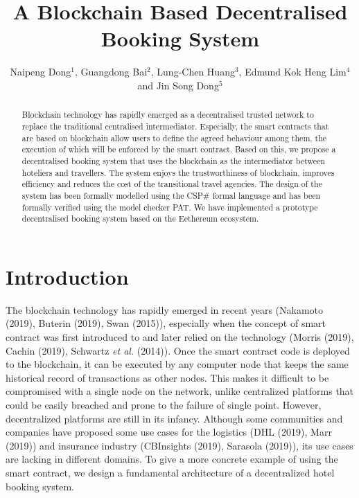 \documentclass{KERauth}
\begin{document}


\onehalfspacing

\title{A Blockchain Based Decentralised Booking System}

\author{Naipeng Dong$^1$, Guangdong Bai$^2$, Lung-Chen Huang$^3$, Edmund Kok Heng Lim$^4$ and Jin Song Dong$^{5}$}
\address{$^{1,3,4,5}$School of Computing, National University of Singapore, COM$1$, $13$ Computing Drive, $117417$, Singapore\\ ~$^{2,5}$School of Information and Communication Technology, Griffith University, N$44$ $2.28$, $170$ Kessels Road Nathan, QLD, $4111$, Australia\\
, $^2$g.bai@griffith.edu.au, $^3$lungchenhuang@u.nus.edu, $^4$e0335737@u.nus.edu, $^5$dcsdjs@nus.edu.sg}


\begin{abstract}
Blockchain technology has rapidly emerged as a decentralised trusted network to replace the traditional centralised intermediator. Especially, the smart contracts that are based on blockchain allow users to define the agreed behaviour among them, the execution of which will be enforced by the smart contract. Based on this, we propose a decentralised booking system that uses the blockchain as the intermediator between hoteliers and travellers. The system enjoys the trustworthiness of blockchain, improves efficiency and reduces the cost of the transitional travel agencies. The design of the system has been formally modelled using the CSP\# formal language and has been formally verified using the model checker PAT. We have implemented a prototype decentralised booking system based on the Eethereum ecosystem.
\end{abstract}

\section{Introduction}

The blockchain technology has rapidly emerged in recent years (Nakamoto (2019), Buterin (2019), Swan (2015)), especially when the concept of smart contract
was first introduced to and later relied on the technology (Morris (2019), Cachin (2019), Schwartz \emph{et al.} (2014)). Once the smart contract code is deployed to the
blockchain, it can be executed by any computer node that keeps the same historical record of transactions as
other nodes. This makes it difficult to be compromised with a single node on the network, unlike centralized
platforms that could be easily breached and prone to the failure of single point. However, decentralized
platforms are still in its infancy. Although some communities and companies have proposed some use cases
for the logistics (DHL (2019), Marr (2019)) and insurance industry (CBInsights (2019), Sarasola (2019)), its use cases are lacking in different domains. To give a more concrete
example of using the smart contract, we design a fundamental architecture of a decentralized hotel booking
system.
\end{document}
